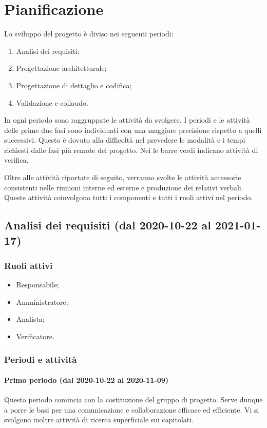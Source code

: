 \section{Pianificazione}



Lo sviluppo del progetto è diviso nei seguenti periodi:
\begin{enumerate}
	\item Analisi dei requisiti;
	\item Progettazione architetturale;
	\item Progettazione di dettaglio e codifica;
	\item Validazione e collaudo.
\end{enumerate}
In ogni periodo sono raggruppate le attività da svolgere.
I periodi e le attività delle prime due fasi sono individuati con una maggiore precisione rispetto a quelli successivi. Questo è dovuto alla difficoltà nel prevedere le modalità e i tempi richiesti dalle fasi più remote del progetto.
Nei  le barre verdi indicano attività di verifica.

Oltre alle attività riportate di seguito, verranno svolte le attività accessorie consistenti nelle riunioni interne ed esterne e produzione dei relativi verbali. Queste attività coinvolgono tutti i componenti e tutti i ruoli attivi nel periodo. 

\subsection{Analisi dei requisiti (dal 2020-10-22 al 2021-01-17)}

\subsubsection{Ruoli attivi}
\begin{itemize}
	\item Responsabile;
	\item Amministratore;
	\item Analista;
	\item Verificatore.
\end{itemize}

\subsubsection{Periodi e attività}

\paragraph{Primo periodo (dal 2020-10-22 al 2020-11-09)}
Questo periodo comincia con la costituzione del gruppo di progetto. Serve dunque a porre le basi per una comunicazione e collaborazione efficace ed efficiente. Vi si svolgono inoltre attività di ricerca superficiale sui capitolati.

